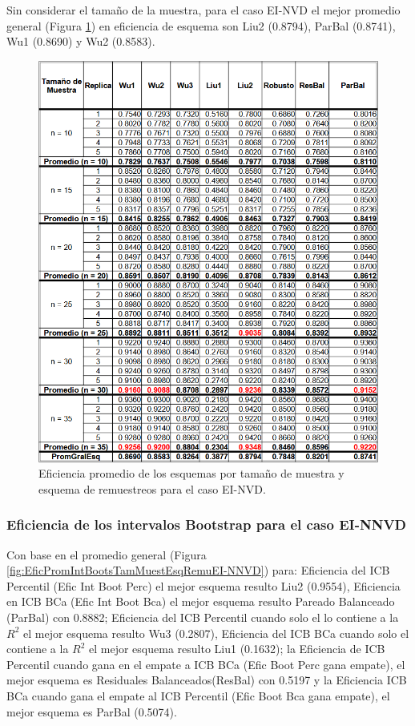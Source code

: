 Sin considerar el tamaño de la muestra, para el caso EI-NVD el mejor promedio general (Figura \ref{fig:EficPromEsqTamMuesEsqRemuEI-NVD}) en eficiencia de esquema son Liu2 (0.8794), ParBal (0.8741), Wu1 (0.8690) y Wu2 (0.8583).


\begin{figure}[ht] 
	\centering 
	\includegraphics[width=0.70\linewidth]{img/EI_NVD_Efic_Esq.png} 
	\caption{Eficiencia promedio de los esquemas por tamaño de muestra y esquema de remuestreos para el caso EI-NVD.} 
	\label{fig:EficPromEsqTamMuesEsqRemuEI-NVD}
\end{figure}
\FloatBarrier


\subsubsection{Eficiencia de los intervalos Bootstrap para el caso EI-NNVD}
Con base en el promedio general (Figura \ref{fig:EficPromIntBootsTamMuestEsqRemuEI-NNVD}) para: Eficiencia del ICB Percentil (Efic Int Boot Perc) el mejor esquema resulto Liu2 (0.9554), Eficiencia en ICB BCa (Efic Int Boot Bca) el mejor esquema resulto Pareado Balanceado (ParBal) con 0.8882; Eficiencia del ICB Percentil cuando solo el lo contiene a la $R^{2}$ el mejor esquema resulto Wu3 (0.2807), Eficiencia del ICB BCa cuando solo el contiene a la $R^{2}$ el mejor esquema resulto Liu1 (0.1632); la Eficiencia de ICB Percentil cuando gana en el empate a ICB BCa (Efic Boot Perc gana empate), el mejor esquema es Residuales Balanceados(ResBal) con 0.5197 y la Eficiencia ICB BCa cuando gana el empate al ICB Percentil (Efic Boot Bca gana empate), el mejor esquema es ParBal (0.5074).
\vspace{.5cm}

